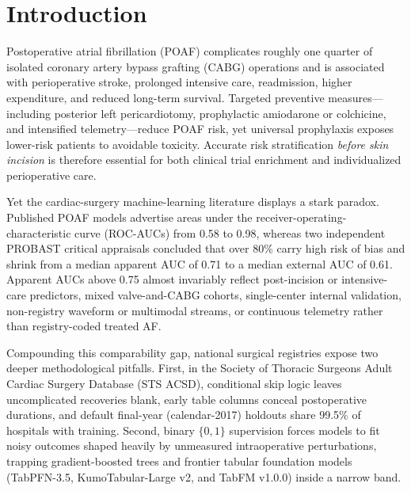 \section{Introduction}
\label{sec:intro}

Postoperative atrial fibrillation (POAF) complicates roughly one quarter of isolated coronary artery bypass grafting (CABG) operations and is associated with perioperative stroke, prolonged intensive care, readmission, higher expenditure, and reduced long-term survival.\cite{aranki1996predictors,villareal2004,dobrev2019postoperative,caldonazo2023meta,gaudino2023ehj} Targeted preventive measures---including posterior left pericardiotomy,\cite{gaudino2021palacs} prophylactic amiodarone or colchicine, and intensified telemetry\cite{chatterjee2026sts}---reduce POAF risk, yet universal prophylaxis exposes lower-risk patients to avoidable toxicity. Accurate risk stratification \emph{before skin incision} is therefore essential for both clinical trial enrichment and individualized perioperative care.

Yet the cardiac-surgery machine-learning literature displays a stark paradox. Published POAF models advertise areas under the receiver-operating-characteristic curve (ROC-AUCs) from 0.58 to 0.98, whereas two independent PROBAST critical appraisals concluded that over 80\% carry high risk of bias and shrink from a median apparent AUC of 0.71 to a median external AUC of 0.61.\cite{fields2025poaf,lopeztuesta2026poaf} Apparent AUCs above 0.75 almost invariably reflect post-incision or intensive-care predictors,\cite{mathew2004multicenter,magee2007atrial,ma2025noaf,cao2025mimic4} mixed valve-and-CABG cohorts,\cite{mariscalco2014poaf,burgos2021comaf} single-center internal validation,\cite{cho2026poaf} non-registry waveform or multimodal streams,\cite{han2025aiecg,khalpey2026digital} or continuous telemetry rather than registry-coded treated AF.\cite{filardo2017telemetry,perezgrovas2023jaha}

Compounding this comparability gap, national surgical registries expose two deeper methodological pitfalls. First, in the Society of Thoracic Surgeons Adult Cardiac Surgery Database (STS ACSD),\cite{sts2014v281,shahian2018sts,obrien2018sts2} conditional skip logic leaves uncomplicated recoveries blank, early table columns conceal postoperative durations, and default final-year (calendar-2017) holdouts share 99.5\% of hospitals with training. Second, binary $\{0,1\}$ supervision forces models to fit noisy outcomes shaped heavily by unmeasured intraoperative perturbations,\cite{echahidi2008mechanisms,dobrev2019postoperative} trapping gradient-boosted trees and frontier tabular foundation models (TabPFN-3.5,\cite{hollmann2025tabpfn,jaeger2026tabpfn35} KumoTabular-Large v2,\cite{qu2026kumotabular} and TabFM v1.0.0\cite{kong2026tabfm}) inside a narrow band.

